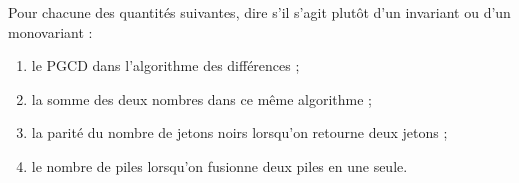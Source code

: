 Pour chacune des quantités suivantes, dire s'il s'agit plutôt d'un
invariant ou d'un monovariant :
\begin{enumerate}
  \item le PGCD dans l'algorithme des différences ;
  \item la somme des deux nombres dans ce même algorithme ;
  \item la parité du nombre de jetons noirs lorsqu'on retourne deux jetons ;
  \item le nombre de piles lorsqu'on fusionne deux piles en une seule.
\end{enumerate}
